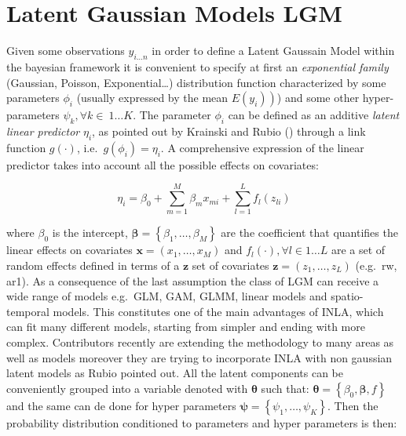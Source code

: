 \documentclass[
  12pt,
  a4paper,
  oneside]{book}
\theoremstyle{definition}
\theoremstyle{definition}
\theoremstyle{definition}
\theoremstyle{remark}
\begin{document}
\hypertarget{LGM}{%
\section{Latent Gaussian Models LGM}\label{LGM}}

Given some observations \(y_{i \ldots n}\) in order to define a Latent Gaussain Model within the bayesian framework it is convenient to specify at first an \emph{exponential family} (Gaussian, Poisson, Exponential\ldots) distribution function characterized by some parameters \(\phi_{i}\) (usually expressed by the mean \(\left.E\left(y_{i}\right)\right)\)) and some other hyper-parameters \(\psi_{k} ,\forall k \in \ 1\ldots K\). The parameter \(\phi_{i}\) can be defined as an additive \emph{latent linear predictor} \(\eta_{i}\), as pointed out by Krainski and Rubio (\citeyearpar{Krainski-Rubio}) through a link function \(g(\cdot)\), i.e.~\(g\left(\phi_{i}\right)=\eta_{i}\). A comprehensive expression of the linear predictor takes into account all the possible effects on covariates:

\[
\eta_{i}=\beta_{0}+\sum_{m=1}^{M} \beta_{m} x_{m i}+\sum_{l=1}^{L} f_{l}\left(z_{l i}\right)
\]

where \(\beta_{0}\) is the intercept, \(\boldsymbol{\beta}=\left\{\beta_{1}, \ldots, \beta_{M}\right\}\) are the coefficient that quantifies the linear effects on covariates \(\boldsymbol{x}=\left({x}_{1}, \ldots, {x}_{M}\right)\) and \(f_{l}(\cdot), \forall l \in 1 \ldots L\) are a set of random effects defined in terms of a \(\boldsymbol{z}\) set of covariates \(\boldsymbol{z}=\left(z_{1}, \ldots, z_{L}\right)\) (e.g.~rw, ar1). As a consequence of the last assumption the class of LGM can receive a wide range of models e.g.~GLM, GAM, GLMM, linear models and spatio-temporal models. This constitutes one of the main advantages of INLA, which can fit many different models, starting from simpler and ending with more complex. Contributors recently are extending the methodology to many areas as well as models moreover they are trying to incorporate INLA with non gaussian latent models as Rubio \citeyearpar{Bayesian_INLA_Rubio} pointed out.
All the latent components can be conveniently grouped into a variable denoted with \(\boldsymbol{\theta}\) such that: \(\boldsymbol{\theta}=\left\{\beta_{0}, \boldsymbol{\beta}, f\right\}\) and the same can de done for hyper parameters \(\boldsymbol{\psi} = \left\{\psi_{1}, \ldots, \psi_{K}\right\}\).
Then the probability distribution conditioned to parameters and hyper parameters is then:
\end{document}
